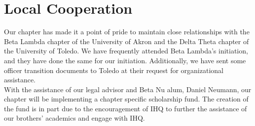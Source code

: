   \section*{Local Cooperation}
    Our chapter has made it a point of pride to maintain close relationships with the Beta Lambda chapter of the University of Akron and the Delta Theta chapter of the University of Toledo. We have frequently attended Beta Lambda's initiation, and they have done the same for our initiation. Additionally, we have sent some officer transition documents to Toledo at their request for organizational assistance. \\

    With the assistance of our legal advisor and Beta Nu alum, Daniel Neumann, our chapter will be implementing a chapter specific scholarship fund. The creation of the fund is in part due to the encouragement of IHQ to further the assistance of our brothers’ academics and engage with IHQ. \\

 